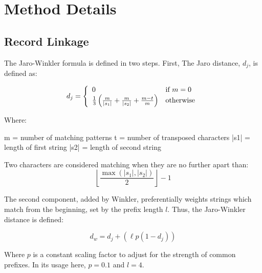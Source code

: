 
\chapter{Method Details}

\section{Record Linkage}
\label{sec:record-linkage-appendix}

The Jaro-Winkler formula is defined in two steps. First, The Jaro distance, $d_j $, is defined as:


\begin{equation}
  d_j = \left\{
  \begin{array}{l l}
    0 & \text{if }m = 0 \\ 
    \frac{1}{3}\left(\frac{m}{|s_1|} + \frac{m}{|s_2|} + \frac{m-t}{m}\right) & \text{otherwise} \end{array} \right.
\end{equation}

Where:

m = number of matching patterns
t = number of transposed characters
|s1| = length of first string
|s2| = length of second string

Two characters are considered matching when they are no further apart than:
\begin{equation}
  \left\lfloor\frac{\max(|s_1|,|s_2|)}{2}\right\rfloor-1
\end{equation}

The second component, added by Winkler, preferentially weights strings which match from the beginning, set by the prefix length $ l $.  Thus, the Jaro-Winkler distance is defined:

\begin{equation}
  d_w = d_j + (\ell p (1 - d_j))
\end{equation}

Where $ p $ is a constant scaling factor to adjust for the strength of common prefixes. In its usage here, $ p = 0.1 $ and $ l = 4 $.


